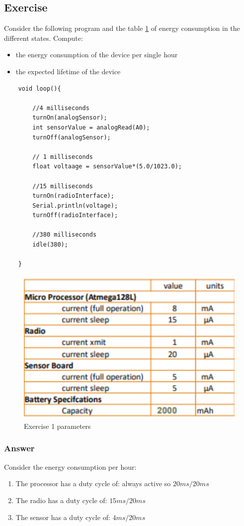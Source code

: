 
	

\subsection{Exercise}\label{sec:exercise}
Consider the following program and the table \ref{chex1-table-dc} of energy consumption in the different states. Compute:
\begin{itemize}
	\item the energy consumption of the device per single hour
	\item the expected lifetime of the device
\end{itemize}
\begin{lstlisting}
	void loop(){
		
		//4 milliseconds
		turnOn(analogSensor);
		int sensorValue = analogRead(A0);
		turnOff(analogSensor);
		
		// 1 milliseconds
		float voltaage = sensorValue*(5.0/1023.0);
		
		//15 milliseconds
		turnOn(radioInterface);
		Serial.println(voltage);
		turnOff(radioInterface);
		
		//380 milliseconds
		idle(380);
		
	}
\end{lstlisting}


\begin{figure}[h]
	\centering\includegraphics[scale=0.45]{images/Pasted image 20230508152346.png}
	\caption{Exercise 1 parameters}
	\label{chex1-table-dc}
\end{figure}



\subsubsection{Answer}\label{sec:answer}
Consider the energy consumption per hour:
\begin{enumerate}
	\item The processor has a duty cycle of: always active so $20ms/20ms$
	\item The radio has a duty cycle of: $15ms / 20ms$
	\item The sensor has a duty cycle of: $4ms / 20ms$
\end{enumerate}

